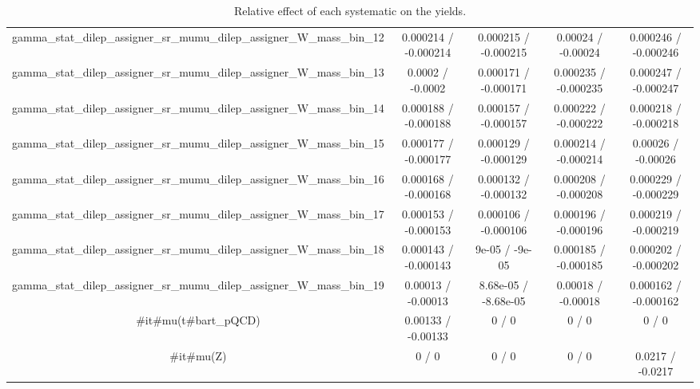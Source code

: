 \documentclass[10pt]{article}
\begin{document}
\begin{table}[htbp]
\begin{center}
\begin{tabular}{|c|c|c|c|c|}
  gamma_stat_dilep_assigner_sr_mumu_dilep_assigner_W_mass_bin_12 & 0.000214 / -0.000214 & 0.000215 / -0.000215 & 0.00024 / -0.00024 & 0.000246 / -0.000246 \\ 
  gamma_stat_dilep_assigner_sr_mumu_dilep_assigner_W_mass_bin_13 & 0.0002 / -0.0002 & 0.000171 / -0.000171 & 0.000235 / -0.000235 & 0.000247 / -0.000247 \\ 
  gamma_stat_dilep_assigner_sr_mumu_dilep_assigner_W_mass_bin_14 & 0.000188 / -0.000188 & 0.000157 / -0.000157 & 0.000222 / -0.000222 & 0.000218 / -0.000218 \\ 
  gamma_stat_dilep_assigner_sr_mumu_dilep_assigner_W_mass_bin_15 & 0.000177 / -0.000177 & 0.000129 / -0.000129 & 0.000214 / -0.000214 & 0.00026 / -0.00026 \\ 
  gamma_stat_dilep_assigner_sr_mumu_dilep_assigner_W_mass_bin_16 & 0.000168 / -0.000168 & 0.000132 / -0.000132 & 0.000208 / -0.000208 & 0.000229 / -0.000229 \\ 
  gamma_stat_dilep_assigner_sr_mumu_dilep_assigner_W_mass_bin_17 & 0.000153 / -0.000153 & 0.000106 / -0.000106 & 0.000196 / -0.000196 & 0.000219 / -0.000219 \\ 
  gamma_stat_dilep_assigner_sr_mumu_dilep_assigner_W_mass_bin_18 & 0.000143 / -0.000143 & 9e-05 / -9e-05 & 0.000185 / -0.000185 & 0.000202 / -0.000202 \\ 
  gamma_stat_dilep_assigner_sr_mumu_dilep_assigner_W_mass_bin_19 & 0.00013 / -0.00013 & 8.68e-05 / -8.68e-05 & 0.00018 / -0.00018 & 0.000162 / -0.000162 \\ 
  #it{#mu}(t#bar{t}_{pQCD}) & 0.00133 / -0.00133 & 0 / 0 & 0 / 0 & 0 / 0 \\ 
  #it{#mu}(Z) & 0 / 0 & 0 / 0 & 0 / 0 & 0.0217 / -0.0217 \\ 
\hline 
\end{tabular} 
\caption{Relative effect of each systematic on the yields.} 
\end{center} 
\end{table} 
\end{document}
